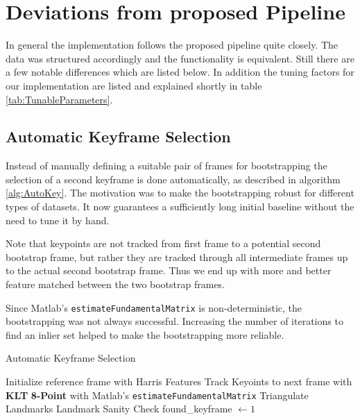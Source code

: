 \documentclass{article}
\begin{document}
\section{Deviations from proposed Pipeline}

In general the implementation follows the proposed pipeline quite closely. The data was structured accordingly and the functionality is equivalent. Still there are a few notable differences which are listed below. In addition the tuning factors for our implementation are listed and explained shortly in table \ref{tab:TunableParameters}.

\subsection{Automatic Keyframe Selection}

Instead of manually defining a suitable pair of frames %
for bootstrapping the selection of a second keyframe %
is done automatically, as described in algorithm %
\ref{alg:AutoKey}. The motivation was to make the %
bootstrapping robust for different types of datasets. It %
now guarantees a sufficiently long initial baseline %
without the need to tune it by hand.

Note that keypoints are not tracked from first frame to %
a potential second bootstrap frame, but rather they are tracked through all intermediate frames up to the actual %
second bootstrap frame. Thus we end up with more and better feature matched between the two bootstrap frames.

Since Matlab's \verb+estimateFundamentalMatrix+ is %
non-deterministic, the bootstrapping was not always %
successful. Increasing the number of iterations to find an inlier set helped to make the %
bootstrapping more reliable.

\begin{algorithm}
\caption{Automatic Keyframe Selection}
\begin{algorithmic}[1]
\State Initialize reference frame with Harris Features
\State Track Keyoints to next frame with \textbf{KLT}
\State \textbf{8-Point} with Matlab's \texttt{estimateFundamentalMatrix}
\State Triangulate Landmarks
\State Landmark Sanity Check
\State found\_keyframe $\gets 1$
\EndIf
\EndWhile
\end{algorithmic}
\label{alg:AutoKey}
\end{algorithm}
\end{document}
